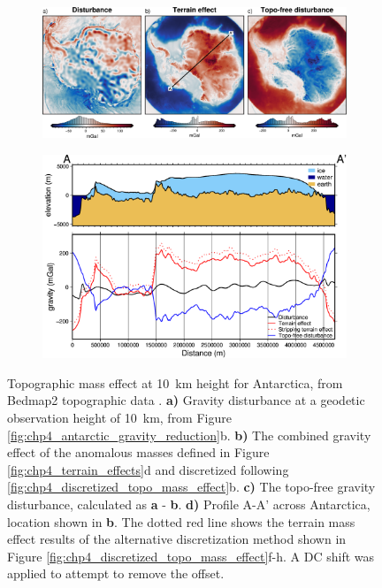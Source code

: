 \begin{figure}[!ht]
  \centering
    \begin{subfigure}[t]{.9\textwidth}
        \centering
        \includegraphics[width=\textwidth]{figures/chp4/antarctic_topo_free_disturbance.png}
    \end{subfigure}
    \begin{subfigure}[t]{.7\textwidth}
        \addtocounter{subfigure}{3}
        \centering
        \includegraphics[width=\textwidth]{figures/chp4/antarctic_topo_free_disturbance_profile.png}
        \caption{}
    \end{subfigure}
  \caption[Topographic mass effect for Antarctica]{Topographic mass effect at 10~km height for Antarctica, from Bedmap2 topographic data \citep{fretwellbedmap22013}. \textbf{a)} Gravity disturbance at a geodetic observation height of 10~km, from Figure \ref{fig:chp4_antarctic_gravity_reduction}b. \textbf{b)} The combined gravity effect of the anomalous masses defined in Figure \ref{fig:chp4_terrain_effects}d and discretized following \ref{fig:chp4_discretized_topo_mass_effect}b. \textbf{c)} The topo-free gravity disturbance, calculated as \textbf{a} - \textbf{b}. \textbf{d)} Profile A-A' across Antarctica, location shown in \textbf{b}. The dotted red line shows the terrain mass effect results of the alternative discretization method shown in Figure \ref{fig:chp4_discretized_topo_mass_effect}f-h. A DC shift was applied to attempt to remove the offset.}
    \label{fig:chp4_antarctic_topo_free_disturbance}
\end{figure}

